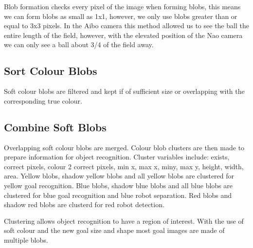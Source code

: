 Blob formation checks every pixel of the image when forming blobs, this means we can form blobs as small as 1x1, however, we only use blobs greater than or equal to 3x3 pixels. In the Aibo camera this method allowed us to see the ball the entire length of the field, however, with the elevated position of the Nao camera we can only see a ball about 3/4 of the field away.

\subsection{Sort Colour Blobs}

Soft colour blobs are filtered and kept if of sufficient size or overlapping with the corresponding true colour. 

\subsection{Combine Soft Blobs}

Overlapping soft colour blobs are merged. Colour blob clusters are then made to prepare information for object recognition. Cluster variables include: exists, correct pixels, colour 2 correct pixels, min x, max x, miny, max y, height, width, area. 
Yellow blobs, shadow yellow blobs and all yellow blobs are clustered for yellow goal recognition. Blue blobs, shadow blue blobs and all blue blobs are clustered for blue goal recognition and blue robot separation. Red blobs and shadow red blobs are clusterd for red robot detection.

Clustering allows object recognition to have a region of interest. With the use of soft colour and the new goal size and shape most goal images are made of multiple blobs.
